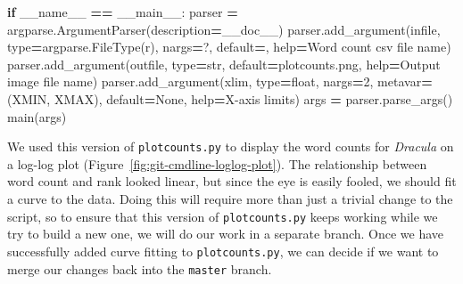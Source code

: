 \documentclass[
]{krantz}
\makeatletter
\newenvironment{Shaded}{\begin{snugshade}}{\end{snugshade}}
\newcommand{\BuiltInTok}[1]{#1}
\newcommand{\ControlFlowTok}[1]{\textcolor[rgb]{0.13,0.29,0.53}{\textbf{#1}}}
\newcommand{\DecValTok}[1]{\textcolor[rgb]{0.00,0.00,0.81}{#1}}
\newcommand{\NormalTok}[1]{#1}
\newcommand{\OperatorTok}[1]{\textcolor[rgb]{0.81,0.36,0.00}{\textbf{#1}}}
\newcommand{\StringTok}[1]{\textcolor[rgb]{0.31,0.60,0.02}{#1}}
\newcommand{\VariableTok}[1]{\textcolor[rgb]{0.00,0.00,0.00}{#1}}
\newenvironment{kframe}{%
\medskip{}
\setlength{\fboxsep}{.8em}
 \def\at@end@of@kframe{}%
 \ifinner\ifhmode%
  \def\at@end@of@kframe{\end{minipage}}%
  \begin{minipage}{\columnwidth}%
 \fi\fi%
 \def\FrameCommand##1{\hskip\@totalleftmargin \hskip-\fboxsep
 \colorbox{shadecolor}{##1}\hskip-\fboxsep
     \hskip-\linewidth \hskip-\@totalleftmargin \hskip\columnwidth}%
 \MakeFramed {\advance\hsize-\width
   \@totalleftmargin\z@ \linewidth\hsize
   \@setminipage}}%
 {\par\unskip\endMakeFramed%
 \at@end@of@kframe}
\renewenvironment{Shaded}{\begin{kframe}}{\end{kframe}}
\makeatother
\begin{document}
\begin{Shaded}
\begin{Highlighting}[]
\ControlFlowTok{if} \VariableTok{\_\_name\_\_} \OperatorTok{==} \StringTok{\textquotesingle{}\_\_main\_\_\textquotesingle{}}\NormalTok{:}
\NormalTok{    parser }\OperatorTok{=}\NormalTok{ argparse.ArgumentParser(description}\OperatorTok{=}\NormalTok{\_\_doc\_\_)}
\NormalTok{    parser.add\_argument(}\StringTok{\textquotesingle{}infile\textquotesingle{}}\NormalTok{, }\BuiltInTok{type}\OperatorTok{=}\NormalTok{argparse.FileType(}\StringTok{\textquotesingle{}r\textquotesingle{}}\NormalTok{), nargs}\OperatorTok{=}\StringTok{\textquotesingle{}?\textquotesingle{}}\NormalTok{,}
\NormalTok{                        default}\OperatorTok{=}\StringTok{\textquotesingle{}{-}\textquotesingle{}}\NormalTok{, }\BuiltInTok{help}\OperatorTok{=}\StringTok{\textquotesingle{}Word count csv file name\textquotesingle{}}\NormalTok{)}
\NormalTok{    parser.add\_argument(}\StringTok{\textquotesingle{}{-}{-}outfile\textquotesingle{}}\NormalTok{, }\BuiltInTok{type}\OperatorTok{=}\BuiltInTok{str}\NormalTok{, default}\OperatorTok{=}\StringTok{\textquotesingle{}plotcounts.png\textquotesingle{}}\NormalTok{,}
                        \BuiltInTok{help}\OperatorTok{=}\StringTok{\textquotesingle{}Output image file name\textquotesingle{}}\NormalTok{)}
\NormalTok{    parser.add\_argument(}\StringTok{\textquotesingle{}{-}{-}xlim\textquotesingle{}}\NormalTok{, }\BuiltInTok{type}\OperatorTok{=}\BuiltInTok{float}\NormalTok{, nargs}\OperatorTok{=}\DecValTok{2}\NormalTok{, metavar}\OperatorTok{=}\NormalTok{(}\StringTok{\textquotesingle{}XMIN\textquotesingle{}}\NormalTok{, }\StringTok{\textquotesingle{}XMAX\textquotesingle{}}\NormalTok{),}
\NormalTok{                        default}\OperatorTok{=}\VariableTok{None}\NormalTok{, }\BuiltInTok{help}\OperatorTok{=}\StringTok{\textquotesingle{}X{-}axis limits\textquotesingle{}}\NormalTok{)}
\NormalTok{    args }\OperatorTok{=}\NormalTok{ parser.parse\_args()}
\NormalTok{    main(args)}
\end{Highlighting}
\end{Shaded}

We used this version of \texttt{plotcounts.py}
to display the word counts for \emph{Dracula} on a log-log plot
(Figure~\ref{fig:git-cmdline-loglog-plot}).
The relationship between word count and rank looked linear,
but since the eye is easily fooled,
we should fit a curve to the data.
Doing this will require more than just a trivial change to the script,
so to ensure that this version of \texttt{plotcounts.py} keeps working
while we try to build a new one,
we will do our work in a separate branch.
Once we have successfully added curve fitting to \texttt{plotcounts.py},
we can decide if we want to merge our changes back into the \texttt{master} branch.
\end{document}
